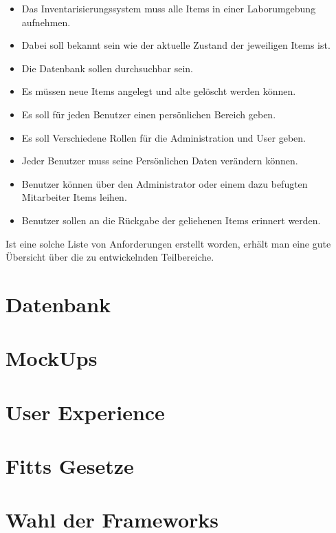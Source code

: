 \begin{itemize}
	\item Das Inventarisierungssystem muss alle Items in einer Laborumgebung aufnehmen. 
	
	\item Dabei soll bekannt sein wie der aktuelle Zustand der jeweiligen Items ist. 
	
	\item Die Datenbank sollen durchsuchbar sein. 
	
	\item Es müssen neue Items angelegt und alte gelöscht werden können. 
	
	\item Es soll für jeden Benutzer einen persönlichen Bereich geben. 
	
	\item Es soll Verschiedene Rollen für die Administration und User geben.
	
	\item Jeder Benutzer muss seine Persönlichen Daten verändern können.
	
	\item Benutzer können über den Administrator oder einem dazu befugten Mitarbeiter Items leihen.
	
	\item Benutzer sollen an die Rückgabe der geliehenen Items erinnert werden.
	
	
\end{itemize}

Ist eine solche Liste von Anforderungen erstellt worden, erhält man eine gute Übersicht über die zu entwickelnden Teilbereiche.


\section{Datenbank}

\section{MockUps}

\section{User Experience}

\section{Fitts Gesetze}

\section{Wahl der Frameworks}
